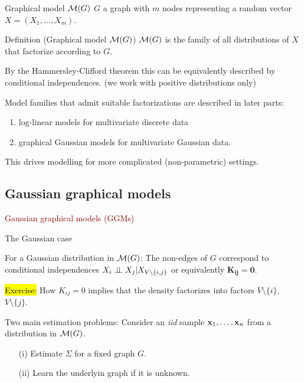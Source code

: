 \documentclass[11pt,handout,aspectratio=169,dvipsnames]{beamer}
\begin{document}
\begin{frame}{Graphical model ${\cal M}(G)$}
	$G$ a graph with $m$ nodes representing a random vector $X=(X_1,\ldots,X_m)$.\\[.3cm]
	\begin{alertblock}{Definition (Graphical model ${\cal M}(G)$)}
		${\cal M}(G)$ is the family of all distributions of $X$ that factorize according to $G$.
	\end{alertblock}
	By the Hammersley-Clifford theorem this can be equivalently described by conditional independences. (we work with positive distributions only)
	\bigskip
	
	Model families that admit suitable factorizations are described in later parts:
\begin{enumerate}
	\item \textcolor{SeaGreen!80!black}{log-linear models} for multivariate discrete data
	\item graphical \textcolor{SeaGreen!80!black}{Gaussian models} for multivariate Gaussian data.
\end{enumerate}
This drives modelling for more complicated (non-parametric) settings.
\end{frame}


\subsection{Gaussian graphical models}
\begin{frame}{}
\begin{center}
	{\huge \textcolor{DarkRed}{Gaussian graphical models (GGMs)}}
\end{center}
\end{frame}


\begin{frame}{The Gaussian case}
\begin{block}{For a Gaussian distribution in ${\cal M}(G)$:}
		The  non-edges of $G$ correspond to conditional independences $X_i\perp\!\!\! \perp X_j|X_{V\setminus \{i,j\}}$ or equivalently \alert{$\mathbf{K_{ij}=0}$}.
\end{block}
\hl{Exercise:} How $K_{ij}=0$ implies that the density factorizes into factors $V\setminus\{i\}$, $V\setminus \{j\}$.

\begin{alertblock}{Two main estimation problems:}
	Consider an \emph{iid} sample $\mathbf{x}_1,\ldots,\mathbf{x}_n$ from a distribution in ${\cal M}(G)$.\\[.2cm]
\begin{enumerate}
	\item [(i)] Estimate $\Sigma$ for a fixed graph $G$.
	\item [(ii)] Learn the underlyin graph if it is unknown.
\end{enumerate} 
\end{alertblock}
\end{frame}
\end{document}
